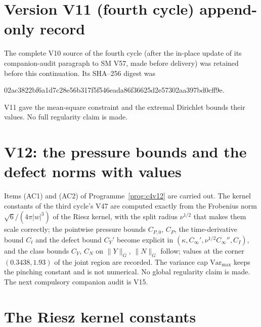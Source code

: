 \documentclass[11pt]{article}
\theoremstyle{plain}
\theoremstyle{definition}
\theoremstyle{remark}
\begin{document}
\section*{Version V11 (fourth cycle) append-only record}

The complete V10 source of the fourth cycle (after the in-place
update of its companion-audit paragraph to SM V57, made before
delivery) was retained before this continuation.  Its SHA--256
digest was
\begin{center}\scriptsize\ttfamily
02ac3822bf6a1d7c28e56b317f5f546eada86f36625d2e57302aa397bd0cff9e.
\end{center}
V11 gave the mean-square constraint and the extremal Dirichlet
bounds their values.  No full regularity claim is made.

\section{V12: the pressure bounds and the defect norms with values}
\label{sec:c4v12-entry}

Items (AC1) and (AC2) of Programme~\ref{prog:c4v12} are carried out.
The kernel constants of the third cycle's V47 are computed exactly
from the Frobenius norm \(\sqrt6/(4\pi|w|^3)\) of the Riesz kernel, with the
split radius \(\nu^{1/2}\) that makes them scale correctly; the pointwise
pressure bounds \(C_{P,0}\), \(C_P\), the time-derivative bound \(C_t\) and the
defect bound \(C_Y'\) become explicit in \((\kappa,C_\infty',\nu^{1/2}C_\infty'',C_I)\), and the class
bounds \(C_Y\), \(C_N\) on \(\|Y\|_G\), \(\|N\|_G\) follow; values at the corner \((0.3438,1.93)\)
of the joint region are recorded.  The variance cap \(\mathrm{Var}_{\max}\) keeps
the pinching constant and is not numerical.  No global regularity
claim is made.  The next compulsory companion audit is V15.

\section{The Riesz kernel constants}
\label{sec:c4v12-kernel}
\end{document}
